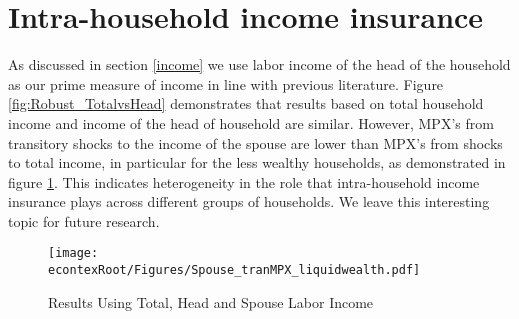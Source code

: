 \documentclass[titlepage]{\econtex}\newcommand{\texname}{ConsumptionHeterogeneity}
\begin{document}
\section{Intra-household income insurance} \label{Insurance}
\setcounter{figure}{0}   
\setcounter{table}{0} 
As discussed in section \ref{income} we use labor income of the head of the household as our prime measure of income in line with previous literature. Figure \ref{fig:Robust_TotalvsHead} demonstrates that results based on total household income and income of the head of household are similar. However, MPX's from transitory shocks to the income of the spouse are lower than MPX's from shocks to total income, in particular for the less wealthy households, as demonstrated in figure \ref{fig:Robust_Spouse}. This indicates heterogeneity in the role that intra-household income insurance plays across different groups of households. We leave this interesting topic for future research. 


\begin{figure} 
	\begin{centering}
		\texttt{[image: \\econtexRoot/Figures/Spouse\_tranMPX\_liquidwealth.pdf]}
		\caption{Results Using Total, Head and Spouse Labor Income}
		\label{fig:Robust_Spouse}
	\end{centering}
\end{figure}

\end{document}
